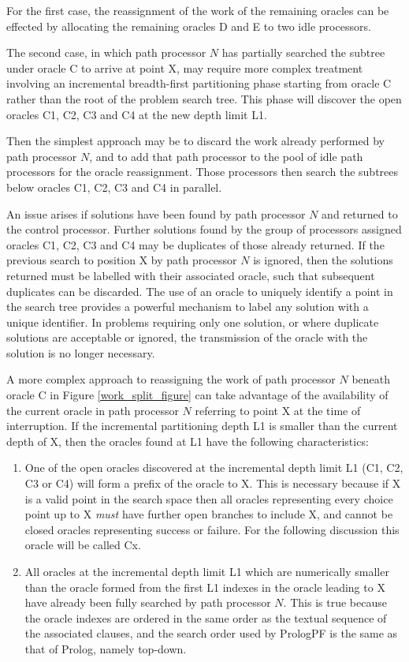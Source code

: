 For the first case, the reassignment of the work of the remaining oracles can be
effected by allocating the remaining oracles D and E to two idle processors.

The second case, in which path processor $N$ has partially searched the subtree
under oracle C to arrive at point X, may require more complex treatment
involving an incremental breadth-first partitioning phase starting from oracle C
rather than the root of the problem search tree.  This phase will discover the
open oracles C1, C2, C3 and C4 at the new depth limit L1.

Then the simplest approach may be to discard the work already performed
by path processor $N$, and to add that path processor to the pool of idle path
processors for the oracle reassignment.  Those processors then search the subtrees
below oracles C1, C2, C3 and C4 in parallel.

An issue arises if solutions have been found by path processor $N$ and returned
to the control processor.  Further solutions found by the group of processors
assigned oracles C1, C2, C3 and C4 may be duplicates of those already returned.
If the previous search to position X
by path processor $N$ is ignored, then the solutions returned must be labelled with
their associated oracle, such that subsequent duplicates can be discarded.  The use
of an oracle to uniquely identify a point in the search tree provides a powerful
mechanism to label any solution with a unique identifier.  In problems requiring
only one solution, or where duplicate solutions are acceptable or ignored, the
transmission of the oracle with the solution is no longer necessary.

A more complex approach to reassigning the work of path processor $N$ beneath oracle
C in Figure \ref{work_split_figure} can take advantage of the
availability of the current oracle in path processor $N$ referring to point X at the
time of interruption.  If the incremental partitioning depth L1 is smaller than
the current depth of X, then the oracles found at L1 have the following characteristics:
\begin{enumerate}
\item{One of the open oracles discovered at the incremental depth limit L1 
 (C1, C2, C3 or C4) will form a prefix of
  the oracle to X.  This is necessary
  because if X is a valid point in the search space then all oracles representing every
  choice point up to X \textit{must} have further open branches to include X, and 
  cannot be closed oracles representing success or failure.  For the following
  discussion this oracle will be called Cx.}
\item{All oracles at the incremental depth limit L1 which are numerically smaller than
  the oracle formed from the first L1 indexes in the oracle leading to X have already
  been fully searched by path processor $N$.  This is true because the oracle indexes are
  ordered in the same order as the textual sequence of the associated clauses, and the
  search order used by PrologPF is the same as that of Prolog, namely top-down.}
\end{enumerate}

